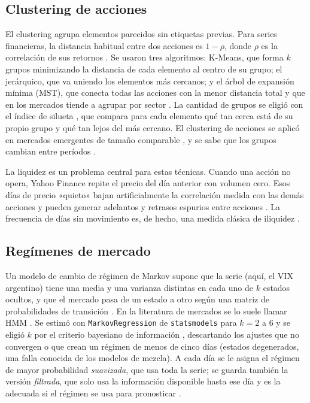 \subsection{Clustering de acciones}

El clustering agrupa elementos parecidos sin etiquetas previas. Para series financieras, la
distancia habitual entre dos acciones es $1-\rho$, donde $\rho$ es la correlación de sus
retornos \citep{mantegna1999,marti2021}. Se usaron tres algoritmos: K-Means, que forma $k$
grupos minimizando la distancia de cada elemento al centro de su grupo; el jerárquico, que va
uniendo los elementos más cercanos; y el árbol de expansión mínima (MST), que conecta todas
las acciones con la menor distancia total y que en los mercados tiende a agrupar por sector
\citep{mantegna1999,onnela2003}. La cantidad de grupos se eligió con el índice de silueta
\citep{rousseeuw1987}, que compara para cada elemento qué tan cerca está de su propio grupo y
qué tan lejos del más cercano. El clustering de acciones se aplicó en mercados emergentes de
tamaño comparable \citep{ghosh2025,ramirez2025,alexandre2021}, y se sabe que los grupos
cambian entre períodos \citep{arratia2013,pharasi2020}.

La liquidez es un problema central para estas técnicas. Cuando una acción no opera, Yahoo
Finance repite el precio del día anterior con volumen cero. Esos días de precio «quieto»
bajan artificialmente la correlación medida con las demás acciones
\citep{nanyonga2025,busca2023} y pueden generar adelantos y retrasos espurios entre acciones
\citep{lomackinlay1990,huth2011}. La frecuencia de días sin movimiento es, de hecho, una
medida clásica de iliquidez \citep{lesmond1999}.

\subsection{Regímenes de mercado}

Un modelo de cambio de régimen de Markov supone que la serie (aquí, el VIX argentino) tiene
una media y una varianza distintas en cada uno de $k$ estados ocultos, y que el mercado pasa de
un estado a otro según una matriz de probabilidades de transición
\citep{hamilton1989,kim1994}. En la literatura de mercados se lo suele llamar HMM
\citep{rabiner1989}. Se estimó con \texttt{MarkovRegression} de \texttt{statsmodels} para
$k=2$ a 6 y se eligió $k$ por el criterio bayesiano de información \citep[BIC;][]{schwarz1978},
descartando los ajustes que no convergen o que crean un régimen de menos de cinco días
(estados degenerados, una falla conocida de los modelos de mezcla). A cada día se le asigna el
régimen de mayor probabilidad \textit{suavizada}, que usa toda la serie; se guarda también la
versión \textit{filtrada}, que solo usa la información disponible hasta ese día y es la
adecuada si el régimen se usa para pronosticar \citep{majumder2023}.

